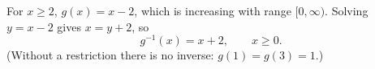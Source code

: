 For $x\ge2$, $g(x)=x-2$, which is increasing with range $[0,\infty)$. Solving $y=x-2$ gives $x=y+2$, so
\[g^{-1}(x)=\boxed{x+2},\qquad x\ge0.\]
(Without a restriction there is no inverse: $g(1)=g(3)=1$.)
